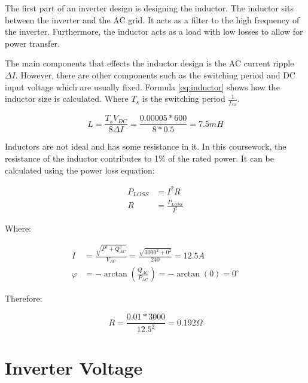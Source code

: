 \documentclass[12pt]{article}
\begin{document}
The first part of an inverter design is designing the inductor.
The inductor sits between the inverter and the AC grid.
It acts as a filter to the high frequency of the inverter.
Furthermore, the inductor acts as a load with low losses to allow for power transfer.

The main components that effects the inductor design is the AC current ripple $\Delta{I}$.
However, there are other components such as the switching period and DC input voltage which are usually fixed.
Formula \ref{eq:inductor} shows how the inductor size is calculated.
Where $T_{s}$ is the switching period $\frac{1}{f_{sw}}$.

\begin{equation} \label{eq:inductor}
    L = \frac{T_{s} V_{DC}}{8 \Delta{I}} = \frac{0.00005 * 600}{8 * 0.5} = 7.5 mH
\end{equation}

Inductors are not ideal and has some resistance in it.
In this coursework, the resistance of the inductor contributes to 1\% of the rated power.
It can be calculated using the power loss equation:

\begin{equation}
    \begin{aligned}
        P_{LOSS} & = I^{2} R                \\
        R        & = \frac{P_{LOSS}}{I^{2}}
    \end{aligned}
\end{equation}

Where:

\begin{equation}
    \begin{aligned}
        I       & = \frac{\sqrt{P^{2} + Q_{AC}^{2}}}{V_{AC}} = \frac{\sqrt{3000^{2} + 0^{2}}}{240} = 12.5 A \\
        \varphi & = -\arctan(\frac{Q_{AC}}{P_{AC}}) = -\arctan(0) = 0^{\circ{}}
    \end{aligned}
\end{equation}

Therefore:

\begin{equation}
    R = \frac{0.01 * 3000}{12.5^{2}} = 0.192 \Omega
\end{equation}

\section{Inverter Voltage}
\end{document}
